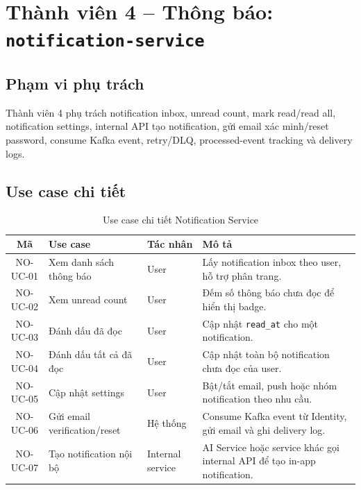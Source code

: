 \documentclass[14pt,a4paper,oneside]{extreport}
\begin{document}
\section{Thành viên 4 -- Thông báo: \texttt{notification-service}}
\label{sec:phase3-notification}

\subsection{Phạm vi phụ trách}

Thành viên 4 phụ trách notification inbox, unread count, mark read/read all, notification settings, internal API tạo notification, gửi email xác minh/reset password, consume Kafka event, retry/DLQ, processed-event tracking và delivery logs.

\subsection{Use case chi tiết}

\begin{table}[H]
\centering
\caption{Use case chi tiết Notification Service}
\label{tab:uc-notification}
\renewcommand{\arraystretch}{1.3}
\small
\begin{tabularx}{\textwidth}{|c|l|l|X|}
\hline
\textbf{Mã} & \textbf{Use case} & \textbf{Tác nhân} & \textbf{Mô tả} \\
\hline
NO-UC-01 & Xem danh sách thông báo & User & Lấy notification inbox theo user, hỗ trợ phân trang. \\
\hline
NO-UC-02 & Xem unread count & User & Đếm số thông báo chưa đọc để hiển thị badge. \\
\hline
NO-UC-03 & Đánh dấu đã đọc & User & Cập nhật \texttt{read\_at} cho một notification. \\
\hline
NO-UC-04 & Đánh dấu tất cả đã đọc & User & Cập nhật toàn bộ notification chưa đọc của user. \\
\hline
NO-UC-05 & Cập nhật settings & User & Bật/tắt email, push hoặc nhóm notification theo nhu cầu. \\
\hline
NO-UC-06 & Gửi email verification/reset & Hệ thống & Consume Kafka event từ Identity, gửi email và ghi delivery log. \\
\hline
NO-UC-07 & Tạo notification nội bộ & Internal service & AI Service hoặc service khác gọi internal API để tạo in-app notification. \\
\hline
\end{tabularx}
\end{table}
\end{document}
